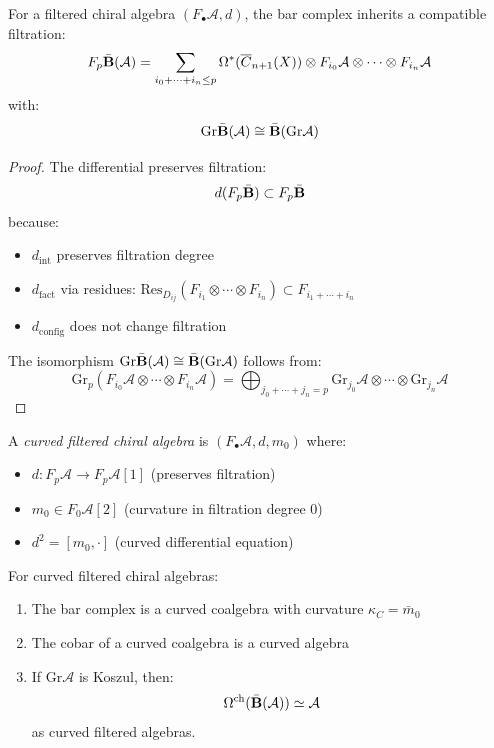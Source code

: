 \begin{theorem}
\label{thm:filtered-bar-complex}
For a filtered chiral algebra $(F_\bullet\mathcal{A}, d)$, the bar complex inherits a compatible filtration:
\[F_p\bar{\mathbf{B}}(\mathcal{A}) = \sum_{i_0 + \cdots + i_n \leq p} \Omega^*(\overline{C}_{n+1}(X)) \otimes F_{i_0}\mathcal{A} \otimes \cdots \otimes F_{i_n}\mathcal{A}\]
with:
\[\text{Gr}\bar{\mathbf{B}}(\mathcal{A}) \cong \bar{\mathbf{B}}(\text{Gr}\mathcal{A})\]
\end{theorem}

\begin{proof}
The differential preserves filtration:
\[d(F_p\bar{\mathbf{B}}) \subset F_p\bar{\mathbf{B}}\]
because:
\begin{itemize}
\item $d_{\text{int}}$ preserves filtration degree
\item $d_{\text{fact}}$ via residues: $\text{Res}_{D_{ij}}(F_{i_1} \otimes \cdots \otimes F_{i_n}) \subset F_{i_1 + \cdots + i_n}$
\item $d_{\text{config}}$ does not change filtration
\end{itemize}

The isomorphism $\text{Gr}\bar{\mathbf{B}}(\mathcal{A}) \cong \bar{\mathbf{B}}(\text{Gr}\mathcal{A})$ follows from:
\[\text{Gr}_p(F_{i_0}\mathcal{A} \otimes \cdots \otimes F_{i_n}\mathcal{A}) = \bigoplus_{j_0 + \cdots + j_n = p} \text{Gr}_{j_0}\mathcal{A} \otimes \cdots \otimes \text{Gr}_{j_n}\mathcal{A}\]
\end{proof}

\begin{definition}
A \emph{curved filtered chiral algebra} is $(F_\bullet\mathcal{A}, d, m_0)$ where:
\begin{itemize}
\item $d: F_p\mathcal{A} \to F_p\mathcal{A}[1]$ (preserves filtration)
\item $m_0 \in F_0\mathcal{A}[2]$ (curvature in filtration degree 0)
\item $d^2 = [m_0, \cdot]$ (curved differential equation)
\end{itemize}
\end{definition}

\begin{theorem}
\label{thm:curved-koszul-duality}
For curved filtered chiral algebras:
\begin{enumerate}
\item The bar complex is a curved coalgebra with curvature $\kappa_C = \bar{m}_0$
\item The cobar of a curved coalgebra is a curved algebra
\item If $\text{Gr}\mathcal{A}$ is Koszul, then:
\[\Omega^{\text{ch}}(\bar{\mathbf{B}}(\mathcal{A})) \simeq \mathcal{A}\]
as curved filtered algebras.
\end{enumerate}
\end{theorem}

